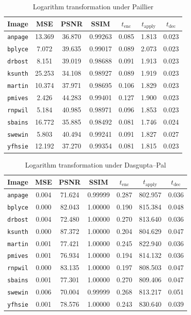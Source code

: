\begin{table}[h]
	\caption{Logarithm transformation under Paillier}
	\label{tbl:log-pal}
    \begin{tabular}{lcccccc}
        \toprule
        Image & MSE  & PSNR & SSIM & $t_\text{enc}$ & $t_\text{apply}$ & $t_\text{dec}$ \\ \midrule
		\texttt{anpage} & 13.369 & 36.870 & 0.99263 & 0.085 & 1.813 & 0.023 \\
		\texttt{bplyce} & 7.072 & 39.635 & 0.99017 & 0.089 & 2.073 & 0.023 \\
		\texttt{drbost} & 8.151 & 39.019 & 0.98688 & 0.091 & 1.913 & 0.023 \\
		\texttt{ksunth} & 25.253 & 34.108 & 0.98927 & 0.089 & 1.919 & 0.023 \\
		\texttt{martin} & 10.374 & 37.971 & 0.98695 & 0.106 & 1.829 & 0.023 \\
		\texttt{pmives} & 2.426 & 44.283 & 0.99401 & 0.127 & 1.900 & 0.023 \\
		\texttt{rnpwil} & 5.184 & 40.985 & 0.98971 & 0.096 & 1.853 & 0.023 \\
		\texttt{sbains} & 16.772 & 35.885 & 0.98492 & 0.081 & 1.746 & 0.024 \\
		\texttt{swewin} & 5.803 & 40.494 & 0.99241 & 0.091 & 1.827 & 0.027 \\
		\texttt{yfhsie} & 12.192 & 37.270 & 0.99354 & 0.081 & 1.815 & 0.023 \\
		\bottomrule
        \end{tabular}
\end{table}
\begin{table}[h]
	\caption{Logarithm transformation under Dasgupta--Pal}
	\label{tbl:log-dp}
    \begin{tabular}{lcccccc}
        \toprule
        Image & MSE  & PSNR & SSIM & $t_\text{enc}$ & $t_\text{apply}$ & $t_\text{dec}$ \\ \midrule
		\texttt{anpage} & 0.004 & 71.624 & 0.99999 & 0.287 & 802.957 & 0.036 \\
		\texttt{bplyce} & 0.000 & 82.043 & 1.00000 & 0.190 & 815.384 & 0.048 \\
		\texttt{drbost} & 0.004 & 72.480 & 1.00000 & 0.270 & 813.640 & 0.036 \\
		\texttt{ksunth} & 0.000 & 87.372 & 1.00000 & 0.204 & 804.629 & 0.047 \\
		\texttt{martin} & 0.001 & 77.421 & 1.00000 & 0.245 & 822.940 & 0.036 \\
		\texttt{pmives} & 0.001 & 76.934 & 1.00000 & 0.194 & 814.132 & 0.036 \\
		\texttt{rnpwil} & 0.000 & 83.135 & 1.00000 & 0.197 & 808.503 & 0.047 \\
		\texttt{sbains} & 0.001 & 77.301 & 1.00000 & 0.270 & 809.406 & 0.047 \\
		\texttt{swewin} & 0.006 & 70.004 & 0.99999 & 0.268 & 813.217 & 0.051 \\
		\texttt{yfhsie} & 0.001 & 78.576 & 1.00000 & 0.243 & 830.640 & 0.039 \\
		\bottomrule
        \end{tabular}
\end{table}


